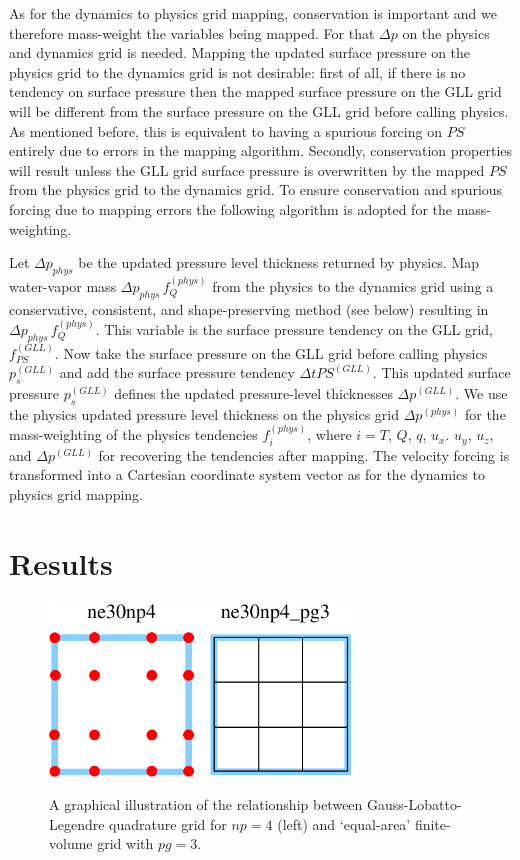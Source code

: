As for the dynamics to physics grid mapping, conservation is important and we therefore mass-weight the variables being mapped. For that $\Delta p$ on the physics and dynamics grid is needed. Mapping the updated surface pressure on the physics grid to the dynamics grid is not desirable: first of all, if there is no tendency on surface pressure then the mapped surface pressure on the GLL grid will be different from the surface pressure on the GLL grid before calling physics. As mentioned before, this is equivalent to having a spurious forcing on $PS$ entirely due to errors in the mapping algorithm. Secondly, conservation properties will result unless the GLL grid surface pressure is overwritten by the mapped $PS$ from the physics grid to the dynamics grid. To ensure conservation and spurious forcing due to mapping errors the following algorithm is adopted for the mass-weighting.

Let $\Delta p_{phys}$ be the updated pressure level thickness returned by physics. Map water-vapor mass $\Delta p_{phys}\, f_Q^{(phys)}$ from the physics to the dynamics grid using a conservative, consistent, and shape-preserving method (see below) resulting in $\Delta p_{phys}\, f_Q^{(phys)}$. This variable is the surface pressure tendency on the GLL grid, $f_{PS}^{(GLL)}$. Now take the surface pressure on the GLL grid before calling physics $p_s^{(GLL)}$ and add the surface pressure tendency $\Delta t PS^{(GLL)}$. This updated surface pressure $p_s^{(GLL)}$ defines the updated pressure-level thicknesses $\Delta p^{(GLL)}$. We use the physics updated pressure level thickness on the physics grid $\Delta p^{(phys)}$ for the mass-weighting of the physics tendencies $f^{(phys)}_i$, where $i=T$, $Q$, $q$, $u_x$. $u_y$, $u_z$, and $\Delta p^{(GLL)}$ for recovering the tendencies after mapping. The velocity forcing is transformed into a Cartesian coordinate system vector as for the dynamics to physics grid mapping.


\section{Results}
\begin{figure}[t]
\noindent\includegraphics[width=19pc,angle=0]{figs/np4_pg3.pdf}\\
  \caption{A graphical illustration of the relationship between Gauss-Lobatto-Legendre quadrature grid for $np=4$ (left) and `equal-area' finite-volume grid with $pg=3$.}\label{fig:grids}
\end{figure}
